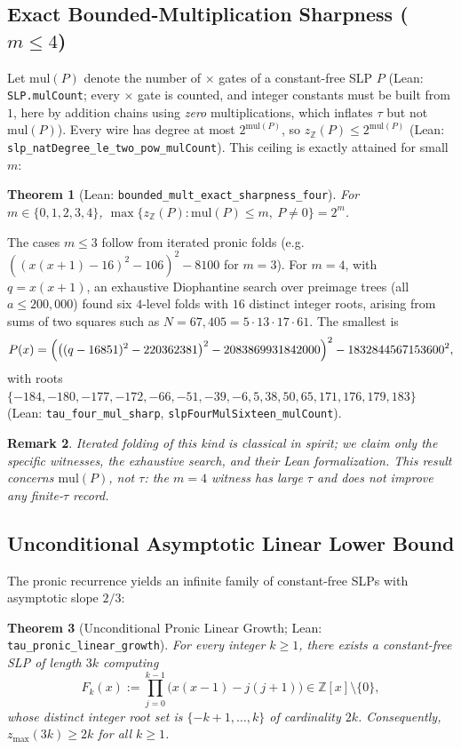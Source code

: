 \documentclass[11pt]{article}
\newtheorem{theorem}{Theorem}[section]
\newtheorem{remark}[theorem]{Remark}
\newcommand{\Z}{\mathbb{Z}}
\newcommand{\code}[1]{\texttt{#1}}
\newcommand{\zmax}{z_{\max}}
\begin{document}
\subsection{Exact Bounded-Multiplication Sharpness ($m \le 4$)}
Let $\mathrm{mul}(P)$ denote the number of $\times$ gates of a constant-free SLP $P$ (Lean: \code{SLP.mulCount}; every $\times$ gate is counted, and integer constants must be built from $1$, here by addition chains using \emph{zero} multiplications, which inflates $\tau$ but not $\mathrm{mul}(P)$). Every wire has degree at most $2^{\mathrm{mul}(P)}$, so $z_{\Z}(P) \le 2^{\mathrm{mul}(P)}$ (Lean: \code{slp\_natDegree\_le\_two\_pow\_mulCount}). This ceiling is exactly attained for small $m$:
\begin{theorem}[Lean: \code{bounded\_mult\_exact\_sharpness\_four}]
For $m \in \{0,1,2,3,4\}$, $\max\{z_{\Z}(P) : \mathrm{mul}(P) \le m,\ P \neq 0\} = 2^m$.
\end{theorem}
The cases $m \le 3$ follow from iterated pronic folds (e.g.\ $((x(x{+}1)-16)^2-106)^2-8100$ for $m=3$). For $m=4$, with $q = x(x+1)$, an exhaustive Diophantine search over preimage trees (all $a \le 200{,}000$) found six $4$-level folds with $16$ distinct integer roots, arising from sums of two squares such as $N = 67{,}405 = 5\cdot 13\cdot 17\cdot 61$. The smallest is
\[
  P(x) = \Bigl(\bigl((q-16851)^2 - 220362381\bigr)^2 - 2083869931842000\Bigr)^2 - 1832844567153600^2,
\]
with roots $\{-184,-180,-177,-172,-66,-51,-39,-6,5,38,50,65,171,176,179,183\}$ (Lean: \code{tau\_four\_mul\_sharp}, \code{slpFourMulSixteen\_mulCount}).
\begin{remark}
Iterated folding of this kind is classical in spirit; we claim only the specific witnesses, the exhaustive search, and their Lean formalization. This result concerns $\mathrm{mul}(P)$, not $\tau$: the $m=4$ witness has large $\tau$ and does not improve any finite-$\tau$ record.
\end{remark}

\subsection{Unconditional Asymptotic Linear Lower Bound}
The pronic recurrence yields an infinite family of constant-free SLPs with asymptotic slope $2/3$:

\begin{theorem}[Unconditional Pronic Linear Growth; Lean: \code{tau\_pronic\_linear\_growth}]\label{thm:linear}
For every integer $k \ge 1$, there exists a constant-free SLP of length $3k$ computing
\[
  F_k(x) := \prod_{j=0}^{k-1} \bigl(x(x - 1) - j(j + 1)\bigr) \in \Z[x] \setminus \{0\},
\]
whose distinct integer root set is $\{-k+1, \dots, k\}$ of cardinality $2k$. Consequently, $\zmax(3k) \ge 2k$ for all $k \ge 1$.
\end{theorem}
\end{document}
